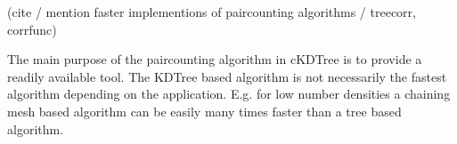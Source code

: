 (cite / mention faster implementions of paircounting algorithms / treecorr, corrfunc)

The main purpose of the paircounting algorithm in cKDTree is to provide a readily
available tool. The KDTree based algorithm is not necessarily the fastest algorithm
depending on the application. E.g. for low number densities a chaining mesh based algorithm
can be easily many times faster than a tree based algorithm.

